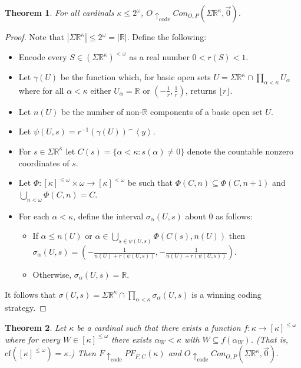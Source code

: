 \documentclass[11pt]{article}
\theoremstyle{plain}
\newtheorem{theorem}{Theorem}
\theoremstyle{definition}
\theoremstyle{remark}
\newcommand{\codewin}{\uparrow_{\text{code}}}
\newcommand{\congame}[2]{Con_{O,P}(#1,#2)}
\newcommand{\sigmaprodr}[1]{\Sigma\mathbb{R}^{#1}}
\begin{document}
\begin{theorem}
For all cardinals $\kappa\leq 2^\omega$, $O\codewin\congame{\sigmaprodr{\kappa}}{\vec{0}}$.
\end{theorem}

\begin{proof}
Note that $|\Sigma\mathbb{R}^\kappa| \leq 2^\omega = |\mathbb{R}|$. Define the following:

    \begin{itemize}
    \item Encode every $S \in (\Sigma\mathbb{R}^{\kappa})^{<\omega}$ as a real number $0<r(S)<1$. 
    \item Let $\gamma(U)$ be the function which, for basic open sets $U=\sigmaprodr{\kappa}\cap\prod_{\alpha<\kappa}U_\alpha$ where for all $\alpha<\kappa$ either $U_\alpha=\mathbb{R}$ or $(-\frac{1}{r},\frac{1}{r})$, returns $\lfloor r \rfloor$.
    \item Let $n(U)$ be the number of non-$\mathbb{R}$ components of a basic open set $U$.
    \item Let $\psi(U,s)=r^{-1}(\gamma(U))^\frown\left<y\right>$.
    \item For $s\in\sigmaprodr{\kappa}$ let $C(s)=\{\alpha<\kappa:s(\alpha)\not=0\}$ denote the countable nonzero coordinates of $s$.
    \item Let $\Phi:[\kappa]^{\leq\omega}\times\omega\to[\kappa]^{<\omega}$ be such that $\Phi(C,n)\subseteq\Phi(C,n+1)$ and $\bigcup_{n<\omega}\Phi(C,n)=C$.
    \item For each $\alpha<\kappa$, define the interval $\sigma_\alpha(U,s)$ about $0$ as follows:
        \begin{itemize}
        \item If $\alpha\leq n(U)$ or $\alpha\in\bigcup_{s\in\psi(U,s)}\Phi(C(s),n(U))$ then $\sigma_\alpha(U,s)=(-\frac{1}{n(U)+r(\psi(U,s))},-\frac{1}{n(U)+r(\psi(U,s))})$.
        \item Otherwise, $\sigma_\alpha(U,s)=\mathbb{R}$.
        \end{itemize}
    \end{itemize}

It follows that $\sigma(U,s)=\sigmaprodr{\kappa}\cap\prod_{\alpha<\kappa} \sigma_\alpha(U,s)$ is a winning coding strategy.
\end{proof}

\begin{theorem}
Let $\kappa$ be a cardinal such that there exists a function $f:\kappa\to[\kappa]^{\leq \omega}$ where for every $W\in[\kappa]^{\leq\omega}$ there exists $\alpha_W<\kappa$ with $W\subseteq f(\alpha_W)$. (That is, $\textrm{cf}([\kappa]^{\leq\omega})=\kappa$.) Then $F \codewin PF_{F,C}(\kappa)$ and $O \codewin \congame{\sigmaprodr{\kappa}}{\vec{0}}$.
\end{theorem}
\end{document}

